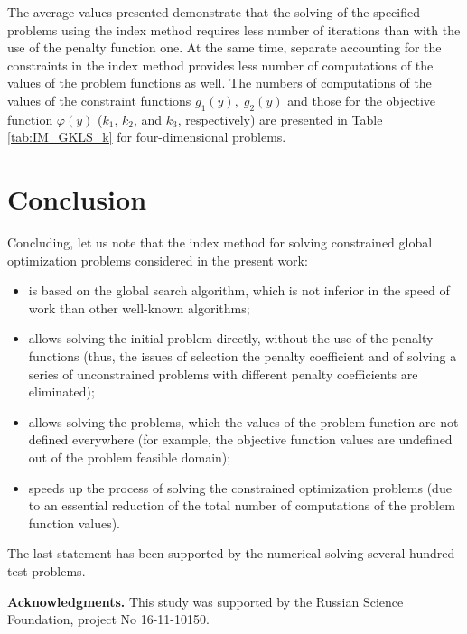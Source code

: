 \documentclass{llncs}
\begin{document}
The  average values presented demonstrate that the solving of the specified problems using the index method requires less number of iterations than with the use of the penalty function one. At the same time, separate accounting for the constraints in the index method provides less number of computations of the values of the problem functions as well. The numbers of computations of the values of the constraint functions $g_1(y), \; g_2(y)$ and those for the objective function $\varphi(y)$ ($k_1$, $k_2$, and $k_3$, respectively) are presented in Table \ref{tab:IM_GKLS_k} for four-dimensional problems.

\section {Conclusion}

Concluding, let us note that the index method for solving constrained global optimization problems considered in the present work:

\begin{itemize}
	\item is based on the global search algorithm, which is not inferior in the speed of work than other well-known algorithms;
	\item allows solving the initial problem directly, without the use of the penalty functions (thus, the issues of selection the penalty coefficient and of solving a series of unconstrained problems with different penalty coefficients are eliminated);
	\item allows solving the problems, which the values of the problem function are not defined everywhere (for example, the objective function values are undefined out of the problem feasible domain);
	\item speeds up the process of solving the constrained optimization problems (due to an essential reduction of the total number of computations of the problem function values).
\end{itemize}
The last statement has been supported by the numerical solving several hundred test problems.

\bigskip

\textbf{Acknowledgments.} This study was supported by the Russian Science Foundation, project No 16-11-10150.
\end{document}
